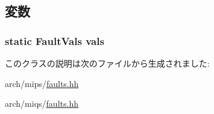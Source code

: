 \subsection{変数}
\hypertarget{classMipsISA_1_1MipsFault_a60c641152aa40196c3b544f1e0f2d567}{
\subsubsection[{vals}]{\setlength{\rightskip}{0pt plus 5cm}static {\bf FaultVals} {\bf vals}}}
\label{classMipsISA_1_1MipsFault_a60c641152aa40196c3b544f1e0f2d567}


このクラスの説明は次のファイルから生成されました:\begin{DoxyCompactItemize}
\item 
arch/mips/\hyperlink{arch_2mips_2faults_8hh}{faults.hh}\item 
arch/miqs/\hyperlink{arch_2miqs_2faults_8hh}{faults.hh}\end{DoxyCompactItemize}
